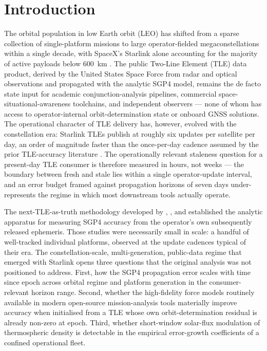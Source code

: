 \documentclass[10pt, letterpaper]{article}
\begin{document}
\section{Introduction}
\label{sec:introduction}

The orbital population in low Earth orbit (LEO) has shifted from a sparse
collection of single-platform missions to large operator-fielded
megaconstellations within a single decade, with SpaceX's Starlink alone
accounting for the majority of active payloads below 600~km
\citep{mcdowell2020}. The public Two-Line Element (TLE) data product,
derived by the United States Space Force from radar and optical
observations and propagated with the analytic SGP4 model, remains the
de facto state input for academic conjunction-analysis pipelines,
commercial space-situational-awareness toolchains, and independent
observers --- none of whom has access to operator-internal
orbit-determination state or onboard GNSS solutions. The operational
character of TLE delivery has, however, evolved with the constellation
era: Starlink TLEs publish at roughly six updates per satellite per day,
an order of magnitude faster than the once-per-day cadence assumed by
the prior TLE-accuracy literature \citep{vallado2006,vallado2012}. The
operationally relevant staleness question for a present-day TLE consumer
is therefore measured in hours, not weeks --- the boundary between fresh
and stale lies within a single operator-update interval, and an error
budget framed against propagation horizons of seven days
under-represents the regime in which most downstream tools actually
operate.

The next-TLE-as-truth methodology developed by \citet{vallado2006},
\citet{vallado2012}, and \citet{vallado_crawford2008} established the
analytic apparatus for measuring SGP4 accuracy from the operator's own
subsequently released ephemeris. Those studies were necessarily small
in scale: a handful of well-tracked individual platforms, observed at
the update cadences typical of their era. The constellation-scale,
multi-generation, public-data regime that emerged with Starlink opens
three questions that the original analysis was not positioned to
address. First, how the SGP4 propagation error scales with time since
epoch across orbital regime and platform generation in the
consumer-relevant horizon range. Second, whether the high-fidelity
force models routinely available in modern open-source mission-analysis
tools materially improve accuracy when initialised from a TLE whose own
orbit-determination residual is already non-zero at epoch. Third,
whether short-window solar-flux modulation of thermospheric density is
detectable in the empirical error-growth coefficients of a confined
operational fleet.
\end{document}

